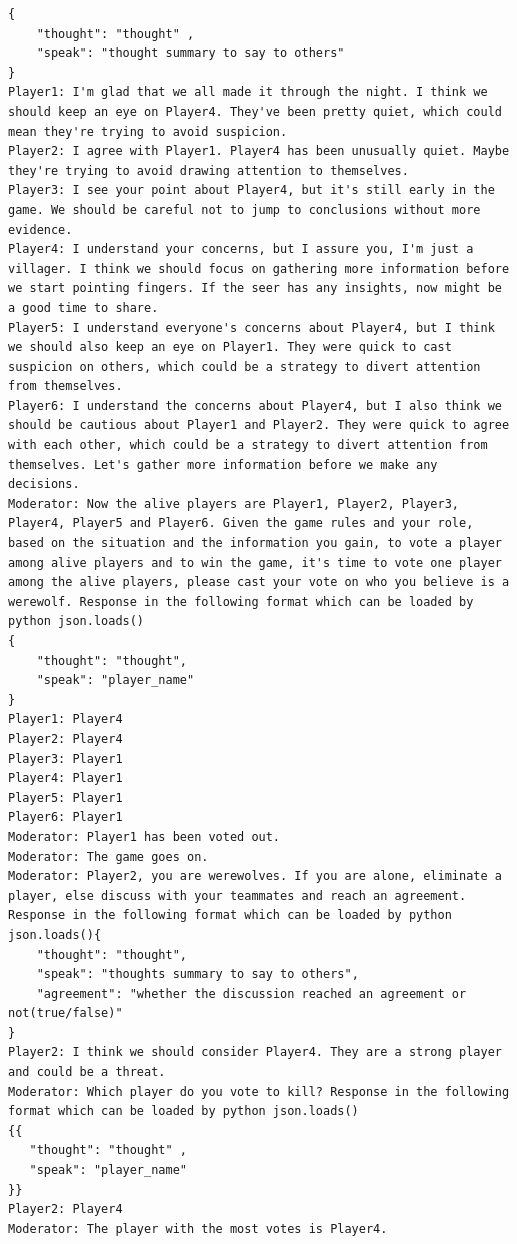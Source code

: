 \begin{lstlisting}[language=Werewolf, caption={Running example of werewolf.}, label={lst:wolf_history}]
{
    "thought": "thought" ,
    "speak": "thought summary to say to others"
}
Player1: I'm glad that we all made it through the night. I think we should keep an eye on Player4. They've been pretty quiet, which could mean they're trying to avoid suspicion.
Player2: I agree with Player1. Player4 has been unusually quiet. Maybe they're trying to avoid drawing attention to themselves.
Player3: I see your point about Player4, but it's still early in the game. We should be careful not to jump to conclusions without more evidence.
Player4: I understand your concerns, but I assure you, I'm just a villager. I think we should focus on gathering more information before we start pointing fingers. If the seer has any insights, now might be a good time to share.
Player5: I understand everyone's concerns about Player4, but I think we should also keep an eye on Player1. They were quick to cast suspicion on others, which could be a strategy to divert attention from themselves.
Player6: I understand the concerns about Player4, but I also think we should be cautious about Player1 and Player2. They were quick to agree with each other, which could be a strategy to divert attention from themselves. Let's gather more information before we make any decisions.
Moderator: Now the alive players are Player1, Player2, Player3, Player4, Player5 and Player6. Given the game rules and your role, based on the situation and the information you gain, to vote a player among alive players and to win the game, it's time to vote one player among the alive players, please cast your vote on who you believe is a werewolf. Response in the following format which can be loaded by python json.loads()
{
    "thought": "thought",
    "speak": "player_name"
}
Player1: Player4
Player2: Player4
Player3: Player1
Player4: Player1
Player5: Player1
Player6: Player1
Moderator: Player1 has been voted out.
Moderator: The game goes on.
Moderator: Player2, you are werewolves. If you are alone, eliminate a player, else discuss with your teammates and reach an agreement. Response in the following format which can be loaded by python json.loads(){
    "thought": "thought",
    "speak": "thoughts summary to say to others",
    "agreement": "whether the discussion reached an agreement or not(true/false)"
}
Player2: I think we should consider Player4. They are a strong player and could be a threat.
Moderator: Which player do you vote to kill? Response in the following format which can be loaded by python json.loads()
{{
   "thought": "thought" ,
   "speak": "player_name"
}}
Player2: Player4
Moderator: The player with the most votes is Player4.

\end{lstlisting}
